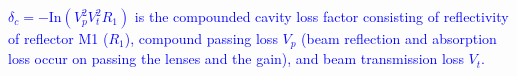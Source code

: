 \documentclass{IEEEtran}
\begin{document}
\textcolor{blue}{$\delta_c=-\text{In}(V_{p}^{2} V_{t}^{2} R_{1})$ is the compounded cavity loss factor consisting of reflectivity of reflector M1 ($R_1$), compound passing loss $V_p$ (beam reflection and absorption loss occur on passing the lenses and the gain), and beam transmission loss $V_t$. 
}
\end{document}
